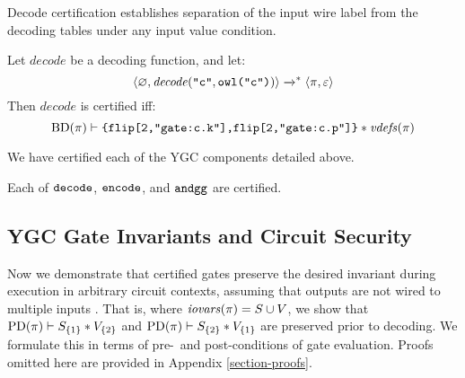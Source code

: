 Decode certification establishes separation of the input wire
label from the decoding tables under any input value condition. 
\begin{definition}
  \label{definition-ygdecode-certification}
  Let $\mathit{decode}$ be a decoding function, and let:
  $$
  \langle \varnothing,\mathit{decode}(\texttt{"c"}, \texttt{owl("c")}) \rangle
  \xrightarrow{}^{*} \langle \pi,\varepsilon \rangle
  $$
  Then $\mathit{decode}$ is certified iff:
  $$
  \mathrm{BD}(\pi) \vdash \texttt{\{flip[2,"gate:c.k"],flip[2,"gate:c.p"]\}} * \mathit{vdefs}(\pi)
  $$
\end{definition}
We have certified each of the YGC components detailed above. 
\begin{lemma}
  \label{lemma-ygc-certification}
  Each of $\texttt{decode}$, $\texttt{encode}$, and $\texttt{andgg}$ are certified.
\end{lemma}

\subsection{YGC Gate Invariants and Circuit Security}
\label{section-ygc-composition}

Now we demonstrate that certified gates preserve the desired invariant
during execution in arbitrary circuit contexts, assuming that outputs are not wired to
multiple inputs \cite{tate2003garbled,nieminen2023breaking}. That is, where
$\mathit{iovars}(\pi) = S \cup V$, we show that
$\mathrm{PD}(\pi) \vdash S_{\{1\}} * V_{\{2\}}$ and
$\mathrm{PD}(\pi) \vdash S_{\{2\}} * V_{\{1\}}$ are preserved prior to
decoding.  We formulate this in terms of pre-~and post-conditions of
gate evaluation. Proofs omitted here are provided in Appendix
\ref{section-proofs}.

